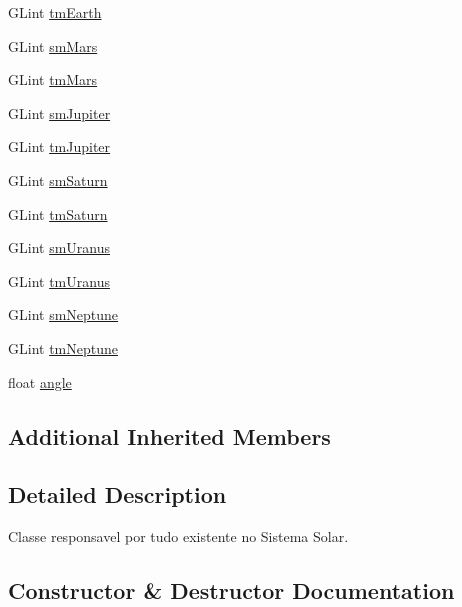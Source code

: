 \begin{DoxyCompactItemize}
\item 
G\+Lint \mbox{\hyperlink{class_scene_texture_a2ce0feda4204441c73daa9cf314c7934}{tm\+Earth}}
\item 
G\+Lint \mbox{\hyperlink{class_scene_texture_a53e9dd31c9f6252442db1ed2df2f71c0}{sm\+Mars}}
\item 
G\+Lint \mbox{\hyperlink{class_scene_texture_aeb24e6bea3bbd3c43509a97b766b4cd7}{tm\+Mars}}
\item 
G\+Lint \mbox{\hyperlink{class_scene_texture_a8b767d351db6d086166c026a036810f0}{sm\+Jupiter}}
\item 
G\+Lint \mbox{\hyperlink{class_scene_texture_a5d2cebac193f3753c99d9a800e521d93}{tm\+Jupiter}}
\item 
G\+Lint \mbox{\hyperlink{class_scene_texture_ab4c9fc4fe91ffbaaaebe6604071fb7d5}{sm\+Saturn}}
\item 
G\+Lint \mbox{\hyperlink{class_scene_texture_a21829ffa49d39e2e30cdf85ac7ac6f06}{tm\+Saturn}}
\item 
G\+Lint \mbox{\hyperlink{class_scene_texture_af7775c2304f9df9bf37b5f1fb7387a48}{sm\+Uranus}}
\item 
G\+Lint \mbox{\hyperlink{class_scene_texture_a212996112183d43e8d0c1d2614320f9d}{tm\+Uranus}}
\item 
G\+Lint \mbox{\hyperlink{class_scene_texture_a582c080d5c8a6a56411380abeb5a03e6}{sm\+Neptune}}
\item 
G\+Lint \mbox{\hyperlink{class_scene_texture_ac8fafaa197bd62d29e625232cc28bdd5}{tm\+Neptune}}
\item 
float \mbox{\hyperlink{class_scene_texture_a444d2a4b6d463ab249f94f107f100b5d}{angle}}
\end{DoxyCompactItemize}
\subsection*{Additional Inherited Members}


\subsection{Detailed Description}
Classe responsavel por tudo existente no Sistema Solar. 

\subsection{Constructor \& Destructor Documentation}
\mbox{\label{class_scene_texture_ae484bb2160a86922204010cfda100e85}} 
